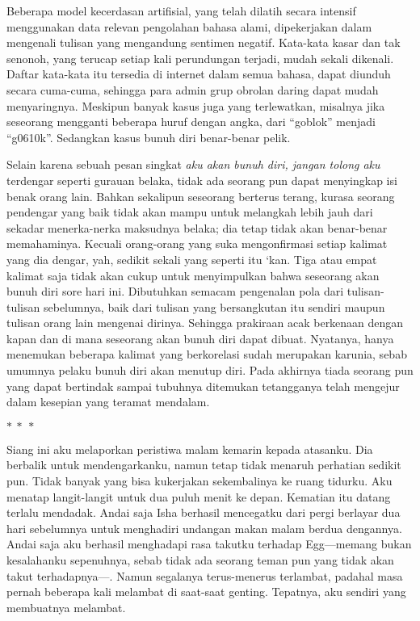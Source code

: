 \documentclass[smalldemyvopaper,11pt,twoside,onecolumn,openright,extrafontsizes]{memoir}
\newcommand\separator{
  \begin{center}
    \(\ast~\ast~\ast\)
  \end{center}
}
\begin{document}


Beberapa model kecerdasan artifisial, yang telah dilatih secara intensif menggunakan data relevan pengolahan bahasa alami, dipekerjakan dalam mengenali tulisan yang mengandung sentimen negatif. Kata-kata kasar dan tak senonoh, yang terucap setiap kali perundungan terjadi, mudah sekali dikenali. Daftar kata-kata itu tersedia di internet dalam semua bahasa, dapat diunduh secara cuma-cuma, sehingga para admin grup obrolan daring dapat mudah menyaringnya. Meskipun banyak kasus juga yang terlewatkan, misalnya jika seseorang mengganti beberapa huruf dengan angka, dari ``goblok'' menjadi ``g0610k''. Sedangkan kasus bunuh diri benar-benar pelik.


Selain karena sebuah pesan singkat \textit{aku akan bunuh diri, jangan tolong aku} terdengar seperti gurauan belaka, tidak ada seorang pun dapat menyingkap isi benak orang lain. Bahkan sekalipun seseorang berterus terang, kurasa seorang pendengar yang baik tidak akan mampu untuk melangkah lebih jauh dari sekadar menerka-nerka maksudnya belaka; dia tetap tidak akan benar-benar memahaminya. Kecuali orang-orang yang suka mengonfirmasi setiap kalimat yang dia dengar, yah, sedikit sekali yang seperti itu `kan. Tiga atau empat kalimat saja tidak akan cukup untuk menyimpulkan bahwa seseorang akan bunuh diri sore hari ini. Dibutuhkan semacam pengenalan pola dari tulisan-tulisan sebelumnya, baik dari tulisan yang bersangkutan itu sendiri maupun tulisan orang lain mengenai dirinya. Sehingga prakiraan acak berkenaan dengan kapan dan di mana seseorang akan bunuh diri dapat dibuat. Nyatanya, hanya menemukan beberapa kalimat yang berkorelasi sudah merupakan karunia, sebab umumnya pelaku bunuh diri akan menutup diri. Pada akhirnya tiada seorang pun yang dapat bertindak sampai tubuhnya ditemukan tetangganya telah mengejur dalam kesepian yang teramat mendalam.

\separator{}

Siang ini aku melaporkan peristiwa malam kemarin kepada atasanku. Dia berbalik untuk mendengarkanku, namun tetap tidak menaruh perhatian sedikit pun. Tidak banyak yang bisa kukerjakan sekembalinya ke ruang tidurku. Aku menatap langit-langit untuk dua puluh menit ke depan. Kematian itu datang terlalu mendadak. Andai saja Isha berhasil mencegatku dari pergi berlayar dua hari sebelumnya untuk menghadiri undangan makan malam berdua dengannya. Andai saja aku berhasil menghadapi rasa takutku terhadap Egg---memang bukan kesalahanku sepenuhnya, sebab tidak ada seorang teman pun yang tidak akan takut terhadapnya---. Namun segalanya terus-menerus terlambat, padahal masa pernah beberapa kali melambat di saat-saat genting. Tepatnya, aku sendiri yang membuatnya melambat.
\end{document}
